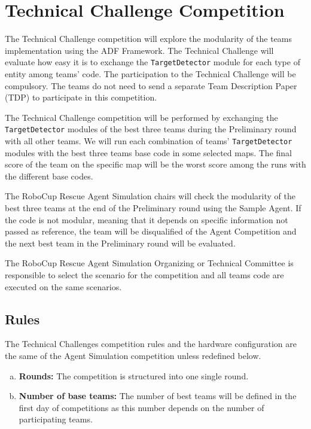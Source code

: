 \documentclass{article}
\begin{document}
\section{Technical Challenge Competition}
\label{sec:technical}
The Technical Challenge competition will explore the modularity of the teams implementation using the ADF Framework. The Technical Challenge will evaluate how easy it is to exchange the \texttt{TargetDetector} module for each type of entity among teams' code. The participation to the Technical Challenge will be compulsory. The teams do not need to send a separate Team Description Paper (TDP) to participate in this competition.

The Technical Challenge competition will be performed by exchanging the \texttt{TargetDetector} modules of the best three teams during the Preliminary round with all other teams. We will run each combination of teams' \texttt{TargetDetector} modules with the best three teams base code in some selected maps. The final score of the team on the specific map will be the worst score among the runs with the different base codes.

The RoboCup Rescue Agent Simulation chairs will check the modularity of the best three teams at the end of the Preliminary round using the Sample Agent. If the code is not modular, meaning that it depends on specific information not passed as reference, the team will be disqualified of the Agent Competition and the next best team in the Preliminary round will be evaluated.

The RoboCup Rescue Agent Simulation Organizing or Technical Committee is responsible to select the scenario for the competition and all teams code are executed on the same scenarios.
\subsection{Rules}
The Technical Challenges competition rules and the hardware configuration are the same of the Agent Simulation competition unless redefined below.
\begin{enumerate}[(a)]
\item \textbf{Rounds:} The competition is structured into one single round.
\item \textbf{Number of base teams:} The number of best teams will be defined in the first day of competitions as this number depends on the number of participating teams.
\end{enumerate}
\end{document}
